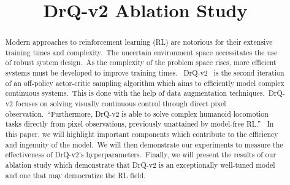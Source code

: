 \documentclass[conference]{./IEEEtran/IEEEtran} %
\begin{document}
    \title{DrQ-v2 Ablation Study}

    \author{
        \and
        \and
    }

    \maketitle

    \begin{abstract}
        
    Modern approaches to reinforcement learning (RL) are notorious for their extensive training times and complexity.\ The uncertain
    environment space necessitates the use of robust system design.\ As the complexity of the problem space rises, more efficient
    systems must be developed to improve training times. \ DrQ-v2~\cite{DrQv2} is the second iteration of an off-policy actor-critic
    sampling algorithm which aims to efficiently model complex continuous systems.\ This is done with the help of data augmentation
    techniques.\ DrQ-v2 focuses on solving visually continuous control through
    direct pixel observation.\ \enquote{Furthermore, DrQ-v2 is able to solve complex humanoid locomotion tasks directly from pixel
    observations, previously unattained by model-free RL.}~\cite{DrQv2} In this paper, we will highlight important components
    which contribute to the efficiency and ingenuity of the model.\ We will then demonstrate our experiments to measure the effectiveness of
    DrQ-v2's hyperparameters.\ Finally, we will present the results of our ablation study which demonstrate that DrQ-v2 is
    an exceptionally well-tuned model and one that may democratize the RL field.

    \end{abstract}
\end{document}
